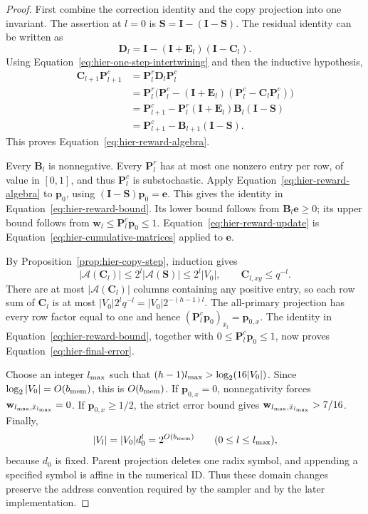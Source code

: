 \documentclass[11pt]{article}
\numberwithin{equation}{section}
\theoremstyle{definition}
\theoremstyle{remark}
\begin{document}
\begin{proof}
First combine the correction identity and the copy projection into one invariant. The assertion at $l=0$ is ${\mathbf{S}}={\mathbf{I}}-({\mathbf{I}}-{\mathbf{S}})$.  The residual identity can be
written as
\[
 {\mathbf{D}}_l={\mathbf{I}}-({\mathbf{I}}+{\mathbf{E}}_l)({\mathbf{I}}-{\mathbf{C}}_l).
\]
Using Equation~\eqref{eq:hier-one-step-intertwining} and then the
inductive hypothesis,
\begin{align*}
 {\mathbf{C}}_{l+1}{\mathbf{P}}_{l+1}^c
 &={\mathbf{P}}_l^r{\mathbf{D}}_l{\mathbf{P}}_l^c\\
 &={\mathbf{P}}_l^r\bigl({\mathbf{P}}_l^c-({\mathbf{I}}+{\mathbf{E}}_l)({\mathbf{P}}_l^c-{\mathbf{C}}_l{\mathbf{P}}_l^c)\bigr)\\
 &={\mathbf{P}}_{l+1}^c-{\mathbf{P}}_l^r({\mathbf{I}}+{\mathbf{E}}_l){\mathbf{B}}_l({\mathbf{I}}-{\mathbf{S}})\\
 &={\mathbf{P}}_{l+1}^c-{\mathbf{B}}_{l+1}({\mathbf{I}}-{\mathbf{S}}).
\end{align*}
This proves Equation~\eqref{eq:hier-reward-algebra}.

Every ${\mathbf{B}}_l$ is nonnegative.  Every ${\mathbf{P}}_l^r$ has at most one nonzero
entry per row, of value in $[0,1]$, and thus ${\mathbf{P}}_l^c$ is
substochastic.  Apply Equation~\eqref{eq:hier-reward-algebra} to
${\mathbf{p}}_0$, using $({\mathbf{I}}-{\mathbf{S}}){\mathbf{p}}_0={\mathbf{e}}$.  This gives the identity in
Equation~\eqref{eq:hier-reward-bound}.  Its lower bound follows from
${\mathbf{B}}_l{\mathbf{e}}\geq0$; its upper bound follows from
${\mathbf{w}}_l\leq {\mathbf{P}}_l^c{\mathbf{p}}_0\leq1$.  Equation~\eqref{eq:hier-reward-update}
is Equation~\eqref{eq:hier-cumulative-matrices} applied to ${\mathbf{e}}$.

By Proposition~\ref{prop:hier-copy-step}, induction gives
\[
 |\mathcal A({\mathbf{C}}_l)|\leq2^l|\mathcal A({\mathbf{S}})|\leq2^l|V_0|,
 \qquad {\mathbf{C}}_{l,xy}\leq q^{-l}.
\]
There are at most $|\mathcal A({\mathbf{C}}_l)|$ columns containing any positive
entry, so each row sum of ${\mathbf{C}}_l$ is at most
$|V_0|2^lq^{-l}=|V_0|2^{-({h}-1)l}$.
The all-primary projection has every row factor equal to one and hence
$({\mathbf{P}}_l^c{\mathbf{p}}_0)_{\bar x_l}={\mathbf{p}}_{0,x}$.  The identity in
Equation~\eqref{eq:hier-reward-bound}, together with
$0\leq {\mathbf{P}}_l^c{\mathbf{p}}_0\leq1$, now proves
Equation~\eqref{eq:hier-final-error}.

Choose an integer ${l_{\rm max}}$ such that
$({h}-1){l_{\rm max}}>\log_2(16|V_0|)$.  Since $\log_2|V_0|=O({b_{\rm mem}})$, this is
$O({b_{\rm mem}})$.  If ${\mathbf{p}}_{0,x}=0$, nonnegativity forces
${\mathbf{w}}_{l_{\rm max},\bar x_{l_{\rm max}}}=0$.  If ${\mathbf{p}}_{0,x}\geq1/2$, the strict error bound
gives ${\mathbf{w}}_{l_{\rm max},\bar x_{l_{\rm max}}}>7/16$.  Finally,
\[
 |V_l|=|V_0|{d}_0^l=2^{O({b_{\rm mem}})}\qquad(0\leq l\leq {l_{\rm max}}),
\]
because ${d}_0$ is fixed.  Parent projection deletes one radix symbol,
and appending a specified symbol is affine in the numerical ID.  Thus
these domain changes preserve the address convention required by the
sampler and by the later implementation.
\end{proof}
\end{document}
